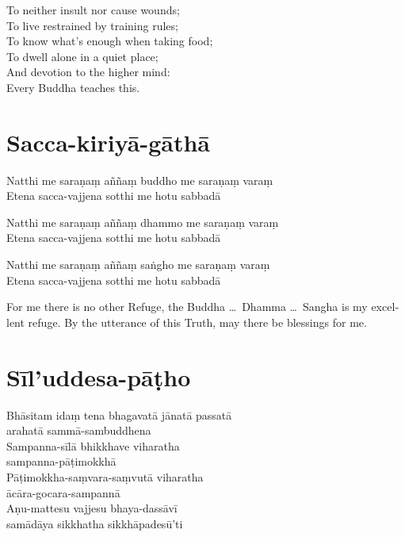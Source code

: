 To neither insult nor cause wounds;\\
To live restrained by training rules;\\
To know what's enough when taking food;\\
To dwell alone in a quiet place;\\
And devotion to the higher mind:\\
Every Buddha teaches this.

\section{Sacca-kiriyā-gāthā}

\begin{leader}
\end{leader}


Natthi me saraṇaṃ aññaṃ buddho me saraṇaṃ varaṃ\\
Etena sacca-vajjena sotthi me hotu sabbadā

Natthi me saraṇaṃ aññaṃ dhammo me saraṇaṃ varaṃ\\
Etena sacca-vajjena sotthi me hotu sabbadā

Natthi me saraṇaṃ aññaṃ saṅgho me saraṇaṃ varaṃ\\
Etena sacca-vajjena sotthi me hotu sabbadā


\begin{english}
  For me there is no other Refuge, the Buddha \ldots\ Dhamma \ldots\ Sangha is
  my excellent refuge. By the utterance of this Truth, may there be blessings
  for me.
\end{english}

\section{Sīl'uddesa-pāṭho}

\begin{leader}
\end{leader}


Bhāsitam idaṃ tena bhagavatā jānatā passatā\\
arahatā sammā-sambuddhena\\
Sampanna-sīlā bhikkhave viharatha\\
sampanna-pāṭimokkhā\\
Pāṭimokkha-saṃvara-saṃvutā viharatha\\
ācāra-gocara-sampannā\\
Aṇu-mattesu vajjesu bhaya-dassāvī\\
samādāya sikkhatha sikkhāpadesū'ti

